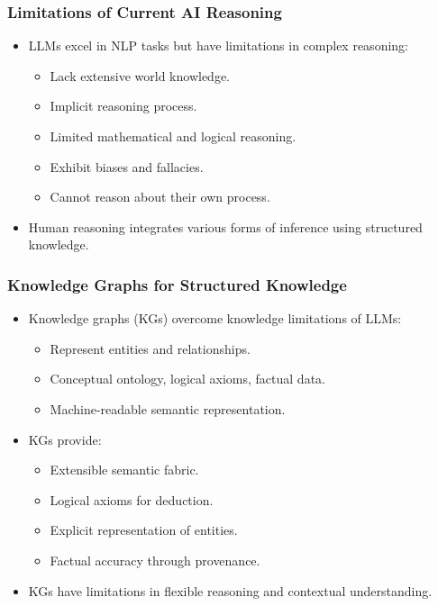 \begin{frame}[fragile]\frametitle{Limitations of Current AI Reasoning}
    \begin{itemize}
        \item LLMs excel in NLP tasks but have limitations in complex reasoning:
        \begin{itemize}
            \item Lack extensive world knowledge.
            \item Implicit reasoning process.
            \item Limited mathematical and logical reasoning.
            \item Exhibit biases and fallacies.
            \item Cannot reason about their own process.
        \end{itemize}
        \item Human reasoning integrates various forms of inference using structured knowledge.
    \end{itemize}
\end{frame}

\begin{frame}[fragile]\frametitle{Knowledge Graphs for Structured Knowledge}
    \begin{itemize}
        \item Knowledge graphs (KGs) overcome knowledge limitations of LLMs:
        \begin{itemize}
            \item Represent entities and relationships.
            \item Conceptual ontology, logical axioms, factual data.
            \item Machine-readable semantic representation.
        \end{itemize}
        \item KGs provide:
        \begin{itemize}
            \item Extensible semantic fabric.
            \item Logical axioms for deduction.
            \item Explicit representation of entities.
            \item Factual accuracy through provenance.
        \end{itemize}
        \item KGs have limitations in flexible reasoning and contextual understanding.
    \end{itemize}
\end{frame}

